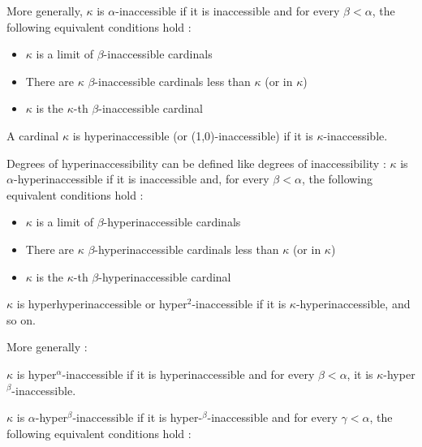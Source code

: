 \documentclass[10pt]{article}
\begin{document}
More generally, \(\kappa\) is \(\alpha\)-inaccessible if it is inaccessible and for every \( \beta < \alpha \), the following equivalent conditions hold :

\begin{itemize}
     \setlength{\itemsep}{1pt}
     \setlength{\parskip}{0pt}
     \setlength{\parsep}{0pt}

\item \(\kappa\) is a limit of \(\beta\)-inaccessible cardinals

\item There are \(\kappa\) \(\beta\)-inaccessible cardinals less than \(\kappa\) (or in \(\kappa\))

\item \(\kappa\) is the \(\kappa\)-th \(\beta\)-inaccessible cardinal

\end{itemize}

A cardinal \(\kappa\) is hyperinaccessible (or (1,0)-inaccessible) if it is \(\kappa\)-inaccessible.

Degrees of hyperinaccessibility can be defined like degrees of inaccessibility : \(\kappa\) is \(\alpha\)-hyperinaccessible if it is inaccessible and, for every \( \beta < \alpha \), the following equivalent conditions hold : 

\begin{itemize}
     \setlength{\itemsep}{1pt}
     \setlength{\parskip}{0pt}
     \setlength{\parsep}{0pt}

\item \(\kappa\) is a limit of \(\beta\)-hyperinaccessible cardinals

\item There are \(\kappa\) \(\beta\)-hyperinaccessible cardinals less than \(\kappa\) (or in \(\kappa\))

\item \(\kappa\) is the \(\kappa\)-th \(\beta\)-hyperinaccessible cardinal

\end{itemize}

\(\kappa\) is hyperhyperinaccessible or hyper\(^2\)-inaccessible if it is \(\kappa\)-hyperinaccessible, and so on.

More generally :

\(\kappa\) is hyper\(^\alpha\)-inaccessible if it is hyperinaccessible and for every \( \beta < \alpha \), it is \(\kappa\)-hyper\(^\beta\)-inaccessible.

\(\kappa\) is \(\alpha\)-hyper\(^\beta\)-inaccessible if it is hyper-\(^\beta\)-inaccessible and for every \( \gamma < \alpha \), the following equivalent conditions hold :
\end{document}
